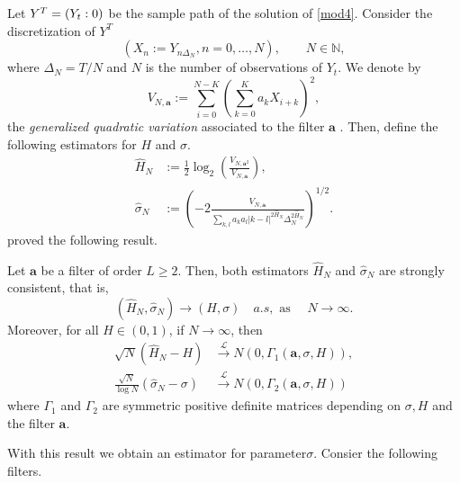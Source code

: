 \documentclass[smallextended]{svjour3}
\newcommand{\IN}{{\mathbb N}}
\begin{document}
    Let $Y^T=(Y_t: 0 \let \le T)$ be  the sample path of the solution of
    \eqref{mod4}. Consider the discretization of $Y^T$
    \[
        (X_n:=Y_{n\Delta_N}, n=0,\ldots,N),\qquad
        N\in \IN,
    \]
    where $\Delta_N=T/N$ and $N$ is the number of observations of $Y_t$. 
    We denote by
    \begin{equation*}
        V_{N,\bm{a}}:= 
        \sum_{i=0} ^ {N - K}
            \left( 
                \sum_{k=0} ^ K a_k X_{i+k} 
            \right)^2,
    \end{equation*}
    the \emph{generalized quadratic variation} associated to the filter $\bm{a}$
    \citet[see, for example][]{is-la}. Then, define the
    following estimators for $H$ and $\sigma$.
    \begin{align}
        \hat{H}_N &:=
        \tfrac{1}{2} \log_2 
        \left(
            \frac{
                V_{N,\bm{a}^2}
            }{
                V_{N,\bm{a}}
            }
        \right), \label{est1}
        \\
        \hat{\sigma}_N
            &:=\left(
                -2
                \frac{V_{N,\bm{a}}}{\sum_{k,l} a_ka_l |k-l|^{2\hat{H}_N} 
                \Delta_N^{2 \hat{H}_N } }\right)^{1/2}.
            \label{est2}
    \end{align}
    \citet[][]{br-ia} proved the following result.
    \begin{theorem}
        Let  $\bm{a}$ be a filter of order $L \ge 2$. Then, both estimators
        $\hat{H}_N$ and $\hat{\sigma}_N$  are
        strongly consistent, that is,
        \[
            (\hat{H}_N,\hat{\sigma}_N) 
            \to
            (H,\sigma) \quad a.s, \text{ as } \quad N \to \infty.
        \]
        Moreover, for all $H \in (0, 1)$, if $N \to  \infty$, then
        \begin{align*}
            \sqrt{N} (\hat{H}_N  - H ) 
                &
                \stackrel{\mathcal{L}}{\to} 
                N (0,\Gamma_1 ( \bm{a},\sigma,H)),
                \\
                \frac{\sqrt{N}}{\log N} ( \hat{\sigma}_N  - \sigma )
                &
                \stackrel{\mathcal{L}}{\to} N (0, \Gamma_2 (\bm{a},\sigma,H))
        \end{align*}
%
        where $\Gamma_1$ and $\Gamma_2$ are symmetric positive definite matrices
        depending on $\sigma, H$ and the filter $\bm{a}$.
    \end{theorem}

    With this result we obtain an estimator for parameter$\sigma$.
    Consier the following filters.
\end{document}
